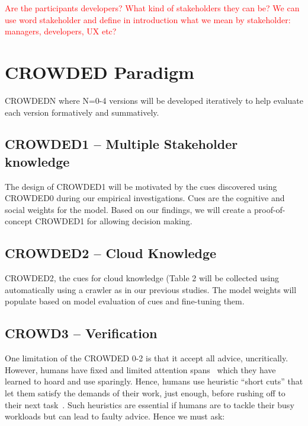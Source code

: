 
\textcolor{red}{Are the participants developers? What kind of stakeholders they can be? We can use word stakeholder and define in introduction what we mean by stakeholder: managers, developers, UX etc?}

\section{CROWDED Paradigm}
CROWDEDN where N=0-4 versions will be developed iteratively to help evaluate each version formatively and summatively.

\subsection{CROWDED1 -- Multiple Stakeholder knowledge}
The design of CROWDED1 will be motivated by the cues discovered using CROWDED0 during our empirical investigations. Cues are the cognitive and social weights for the model. Based on our findings, we will create a proof-of-concept CROWDED1 for allowing decision making. 

\subsection{CROWDED2 -- Cloud Knowledge}
CROWDED2, the cues for cloud knowledge (Table 2 will be collected using automatically using a crawler as in our previous studies. The model weights will populate based on model evaluation of cues and fine-tuning them. 

\subsection{CROWD3 -- Verification}

One limitation of the CROWDED 0-2 is that it accept all advice, uncritically. However, humans have fixed and limited attention spans~\cite{davenport2001attention}  which they  have learned to hoard and use sparingly.  
Hence, humans  use heuristic ``short cuts'' that let 
them satisfy the demands of their work, just enough, before rushing off to their next
task~\cite{simon1956rational}.
Such heuristics are essential if humans are to tackle their busy workloads but
can lead to faulty advice. Hence we must ask:

